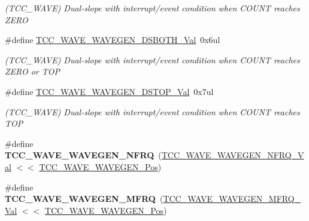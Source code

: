 \begin{DoxyCompactItemize}
\begin{DoxyCompactList}\small\item\em (T\+C\+C\+\_\+\+W\+A\+V\+E) Dual-\/slope with interrupt/event condition when C\+O\+U\+N\+T reaches Z\+E\+R\+O \end{DoxyCompactList}\item 
\hypertarget{group___s_a_m_l21___t_c_c_ga4d5066190c67f24b2eabb721d85645ae}{}\#define \hyperlink{group___s_a_m_l21___t_c_c_ga4d5066190c67f24b2eabb721d85645ae}{T\+C\+C\+\_\+\+W\+A\+V\+E\+\_\+\+W\+A\+V\+E\+G\+E\+N\+\_\+\+D\+S\+B\+O\+T\+H\+\_\+\+Val}~0x6ul\label{group___s_a_m_l21___t_c_c_ga4d5066190c67f24b2eabb721d85645ae}

\begin{DoxyCompactList}\small\item\em (T\+C\+C\+\_\+\+W\+A\+V\+E) Dual-\/slope with interrupt/event condition when C\+O\+U\+N\+T reaches Z\+E\+R\+O or T\+O\+P \end{DoxyCompactList}\item 
\hypertarget{group___s_a_m_l21___t_c_c_gaa1cb0a0b59077e94380e08306e7d7600}{}\#define \hyperlink{group___s_a_m_l21___t_c_c_gaa1cb0a0b59077e94380e08306e7d7600}{T\+C\+C\+\_\+\+W\+A\+V\+E\+\_\+\+W\+A\+V\+E\+G\+E\+N\+\_\+\+D\+S\+T\+O\+P\+\_\+\+Val}~0x7ul\label{group___s_a_m_l21___t_c_c_gaa1cb0a0b59077e94380e08306e7d7600}

\begin{DoxyCompactList}\small\item\em (T\+C\+C\+\_\+\+W\+A\+V\+E) Dual-\/slope with interrupt/event condition when C\+O\+U\+N\+T reaches T\+O\+P \end{DoxyCompactList}\item 
\hypertarget{group___s_a_m_l21___t_c_c_gad74985ed314c60afdfd5d83d6ad06931}{}\#define {\bfseries T\+C\+C\+\_\+\+W\+A\+V\+E\+\_\+\+W\+A\+V\+E\+G\+E\+N\+\_\+\+N\+F\+R\+Q}~(\hyperlink{group___s_a_m_l21___t_c_c_gaaf080c2e6207e177b2faf21b266b58b4}{T\+C\+C\+\_\+\+W\+A\+V\+E\+\_\+\+W\+A\+V\+E\+G\+E\+N\+\_\+\+N\+F\+R\+Q\+\_\+\+Val}     $<$$<$ \hyperlink{group___s_a_m_l21___t_c_c_gabc932c28cfac8cdd585de6664d7665e2}{T\+C\+C\+\_\+\+W\+A\+V\+E\+\_\+\+W\+A\+V\+E\+G\+E\+N\+\_\+\+Pos})\label{group___s_a_m_l21___t_c_c_gad74985ed314c60afdfd5d83d6ad06931}

\item 
\hypertarget{group___s_a_m_l21___t_c_c_ga5c764b180dc8ceb384677fc769ee3148}{}\#define {\bfseries T\+C\+C\+\_\+\+W\+A\+V\+E\+\_\+\+W\+A\+V\+E\+G\+E\+N\+\_\+\+M\+F\+R\+Q}~(\hyperlink{group___s_a_m_l21___t_c_c_ga71f3aa7f2d96d282e8db409c2b611efc}{T\+C\+C\+\_\+\+W\+A\+V\+E\+\_\+\+W\+A\+V\+E\+G\+E\+N\+\_\+\+M\+F\+R\+Q\+\_\+\+Val}     $<$$<$ \hyperlink{group___s_a_m_l21___t_c_c_gabc932c28cfac8cdd585de6664d7665e2}{T\+C\+C\+\_\+\+W\+A\+V\+E\+\_\+\+W\+A\+V\+E\+G\+E\+N\+\_\+\+Pos})\label{group___s_a_m_l21___t_c_c_ga5c764b180dc8ceb384677fc769ee3148}


\end{DoxyCompactItemize}
